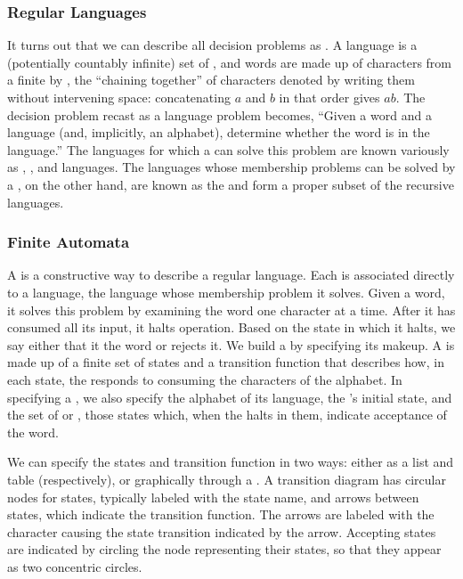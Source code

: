 \subsubsection{Regular Languages}
It turns out that we can describe all decision problems as . A language is a (potentially countably infinite) set of , and words are made up of characters from a finite  by , the ``chaining together'' of characters denoted by writing them without intervening space: concatenating $a$ and $b$ in that order gives $ab$. The decision problem recast as a language problem becomes, ``Given a word and a language (and, implicitly, an alphabet), determine whether the word is in the language.'' The languages for which a \TM can solve this problem are known variously as , , and  languages. The languages whose membership problems can be solved by a \FA{}, on the other hand, are known as the  and form a proper subset of the recursive languages.

\subsubsection{Finite Automata}
A \FA is a constructive way to describe a regular language. Each \FA is associated directly to a language, the language whose membership problem it solves. Given a word, it solves this problem by examining the word one character at a time. After it has consumed all its input, it halts operation. Based on the state in which it halts, we say either that it  the word or rejects it. We build a \FA by specifying its makeup. A \FA is made up of a finite set of states and a transition function that describes how, in each state, the \FA responds to consuming the characters of the alphabet. In specifying a \FA{}, we also specify the alphabet of its language, the \FA's initial state, and the set of  or , those states which, when the \FA halts in them, indicate acceptance of the word.

We can specify the states and transition function in two ways: either as a list and table (respectively), or graphically through a . A transition diagram has circular nodes for states, typically labeled with the state name, and arrows between states, which indicate the transition function. The arrows are labeled with the character causing the state transition indicated by the arrow. Accepting states are indicated by circling the node representing their states, so that they appear as two concentric circles.

